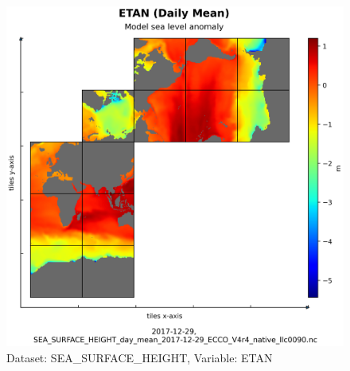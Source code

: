 \begin{figure}[H]
\centering
\includegraphics[scale=0.55]{../images/plots/native_plots/Sea_Surface_Height/ETAN.png}
\caption{Dataset: SEA\_SURFACE\_HEIGHT, Variable: ETAN}
\label{tab:table-SEA_SURFACE_HEIGHT_ETAN-Plot}
\end{figure}
\pagebreak
